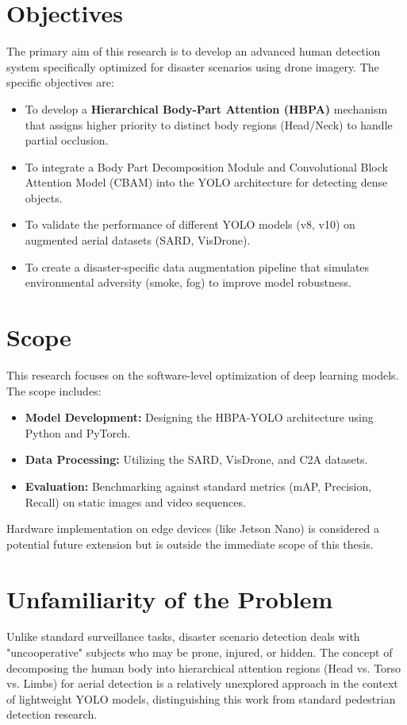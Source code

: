 \documentclass[12pt, a4paper]{report}
\begin{document}
\section{Objectives}
The primary aim of this research is to develop an advanced human detection system specifically optimized for disaster scenarios using drone imagery. The specific objectives are:
\begin{itemize}
    \item To develop a \textbf{Hierarchical Body-Part Attention (HBPA)} mechanism that assigns higher priority to distinct body regions (Head/Neck) to handle partial occlusion.
    \item To integrate a Body Part Decomposition Module and Convolutional Block Attention Model (CBAM) into the YOLO architecture for detecting dense objects.
    \item To validate the performance of different YOLO models (v8, v10) on augmented aerial datasets (SARD, VisDrone).
    \item To create a disaster-specific data augmentation pipeline that simulates environmental adversity (smoke, fog) to improve model robustness.
\end{itemize}

\section{Scope}
This research focuses on the software-level optimization of deep learning models. The scope includes:
\begin{itemize}
    \item \textbf{Model Development:} Designing the HBPA-YOLO architecture using Python and PyTorch.
    \item \textbf{Data Processing:} Utilizing the SARD, VisDrone, and C2A datasets.
    \item \textbf{Evaluation:} Benchmarking against standard metrics (mAP, Precision, Recall) on static images and video sequences.
\end{itemize}
Hardware implementation on edge devices (like Jetson Nano) is considered a potential future extension but is outside the immediate scope of this thesis.

\section{Unfamiliarity of the Problem}
Unlike standard surveillance tasks, disaster scenario detection deals with "uncooperative" subjects who may be prone, injured, or hidden. The concept of decomposing the human body into hierarchical attention regions (Head vs. Torso vs. Limbs) for aerial detection is a relatively unexplored approach in the context of lightweight YOLO models, distinguishing this work from standard pedestrian detection research.
\end{document}
